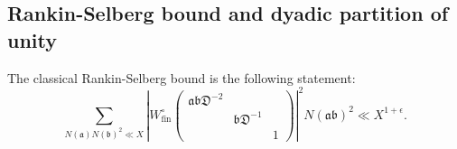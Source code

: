 \documentclass[a4paper,11pt]{amsart}
\theoremstyle{definition}
\newcommand{\fin}{\text{fin}}
\begin{document}
\subsection{Rankin-Selberg bound and dyadic partition of unity}
The classical Rankin-Selberg bound is the following statement:
\begin{equation}\label{eq:classicrankinselberg}
    \sum_{N(\mathfrak{a})N(\mathfrak{b})^2\ll X}\left\vert{W_{\fin}^{\circ}\begin{pmatrix}\mathfrak{ab}\mathfrak{D}^{-2}&&\\&\mathfrak{b}\mathfrak{D}^{-1}&\\&&1\end{pmatrix}}\right\vert^2N(\mathfrak{a}\mathfrak{b})^2 \ll X^{1+\epsilon}.
\end{equation}
\end{document}
